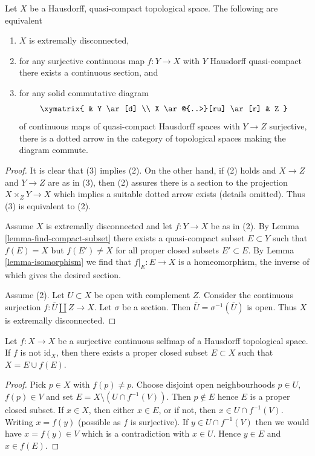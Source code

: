 \begin{proposition}
\label{proposition-projective-in-category-hausdorff-qc}
Let $X$ be a Hausdorff, quasi-compact topological space.
The following are equivalent
\begin{enumerate}
\item $X$ is extremally disconnected,
\item for any surjective continuous map $f : Y \to X$ with $Y$ Hausdorff
quasi-compact there exists a continuous section, and
\item for any solid commutative diagram
$$
\xymatrix{
& Y \ar[d] \\
X \ar@{..>}[ru] \ar[r] & Z
}
$$
of continuous maps of quasi-compact Hausdorff spaces with $Y \to Z$
surjective, there is a dotted arrow
in the category of topological spaces making the diagram commute.
\end{enumerate}
\end{proposition}

\begin{proof}
It is clear that (3) implies (2). On the other hand, if (2) holds
and $X \to Z$ and $Y \to Z$ are as in (3), then (2) assures there
is a section to the projection $X \times_Z Y \to X$ which implies
a suitable dotted arrow exists (details omitted). Thus (3)
is equivalent to (2).

\medskip\noindent
Assume $X$ is extremally disconnected and let $f : Y \to X$ be as in (2).
By Lemma \ref{lemma-find-compact-subset} there exists a quasi-compact subset
$E \subset Y$ such that $f(E) = X$ but $f(E') \not = X$ for all
proper closed subsets $E' \subset E$. By
Lemma \ref{lemma-isomorphism} we find that $f|_E : E \to X$
is a homeomorphism, the inverse of which gives the desired section.

\medskip\noindent
Assume (2). Let $U \subset X$ be open with complement $Z$.
Consider the continuous surjection $f : \overline{U} \amalg Z \to X$.
Let $\sigma$ be a section. Then $\overline{U} = \sigma^{-1}(\overline{U})$
is open. Thus $X$ is extremally disconnected.
\end{proof}

\begin{lemma}
\label{lemma-rainwater}
Let $f : X \to X$ be a surjective continuous selfmap of a Hausdorff
topological space. If $f$ is not $\text{id}_X$, then there exists a
proper closed subset $E \subset X$ such that $X = E \cup f(E)$.
\end{lemma}

\begin{proof}
Pick $p \in X$ with $f(p) \not = p$. Choose disjoint open neighbourhoods
$p \in U$, $f(p) \in V$ and set $E = X \setminus (U \cap f^{-1}(V))$.
Then $p \not \in E$ hence $E$ is a proper closed subset.
If $x \in X$, then either $x \in E$, or if not, then $x \in U \cap f^{-1}(V)$.
Writing $x = f(y)$ (possible as $f$ is surjective). If $y \in U \cap f^{-1}(V)$
then we would have $x = f(y) \in V$ which is a contradiction with
$x \in U$. Hence $y \in E$ and $x \in f(E)$.
\end{proof}

